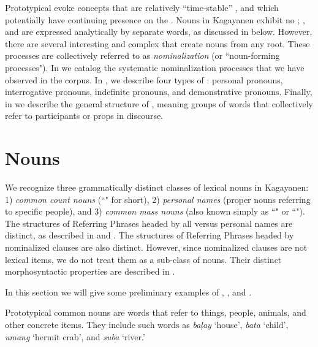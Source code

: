 Prototypical  evoke concepts that are relatively “time-stable” \citep[55]{givon2001-1}, and which potentially have continuing presence on the  \citep{hopper1984-2, du_bois1985}. Nouns in Kagayanen exhibit no ; ,  and  are expressed analytically by separate words, as discussed in  below. However, there are several interesting and complex  that create nouns from any root.  These processes are collectively referred to as \textit{nominalization} (or ``noun-forming processes"). In  we catalog the systematic nominalization processes that we have observed in the corpus. In , we describe four types of : personal pronouns, interrogative pronouns, indefinite pronouns, and demonstrative pronouns. Finally, in  we describe the general structure of , meaning groups of words that collectively refer to participants or props in discourse.

\section{Nouns}
\label{bkm:Ref117344615}
We recognize three grammatically distinct classes of lexical nouns in Kagayanen: 1) \textit{common count nouns} (``" for short), 2) \textit{personal names} (proper nouns referring to specific people), and 3) \textit{common mass nouns} (also known simply as ``" or ``"). The structures of Referring Phrases headed by all  versus personal names are distinct, as described in  and . The structures of Referring Phrases headed by nominalized clauses are also distinct. However, since nominalized clauses are not lexical items, we do not treat them as a sub-class of nouns. Their distinct morphosyntactic properties are described in .

In this section we will give some preliminary examples of , , and .

Prototypical common nouns are words that refer to things, people, animals, and other concrete items. They include such words as \textit{baļay} ‘house’, \textit{bata} ‘child’, \textit{umang} ‘hermit crab’, and \textit{suba} ‘river.’

